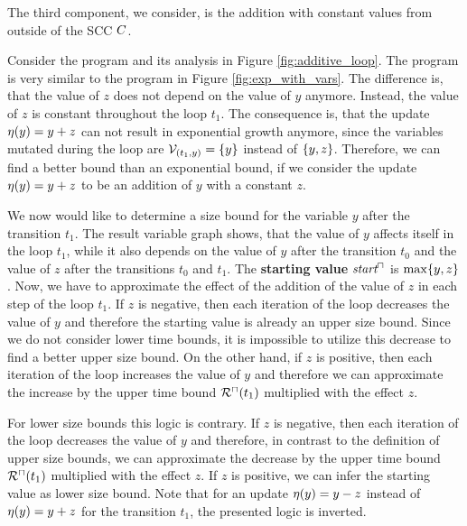 The third component, we consider, is the addition with constant values from outside of the SCC $C$.

\begin{example}
  
  Consider the program and its analysis in Figure \ref{fig:additive_loop}.
  The program is very similar to the program in Figure \ref{fig:exp_with_vars}.
  The difference is, that the value of $z$ does not depend on the value of $y$ anymore.
  Instead, the value of $z$ is constant throughout the loop $t_1$.
  The consequence is, that the update $\eta(y) = y + z$ can not result in exponential growth anymore, since the variables mutated during the loop are $\mathcal{V}_{(t_1,y)} = \lbrace y \rbrace$ instead of $\lbrace y,z \rbrace$.
  Therefore, we can find a better bound than an exponential bound, if we consider the update $\eta(y) = y + z$ to be an addition of $y$ with a constant $z$.
  
  We now would like to determine a size bound for the variable $y$ after the transition $t_1$.
  The result variable graph shows, that the value of $y$ affects itself in the loop $t_1$, while it also depends on the value of $y$ after the transition $t_0$ and the value of $z$ after the transitions $t_0$ and $t_1$.
  The \textbf{starting value} $\emph{start}^\sqcap$ is $\max \lbrace y,z \rbrace$.
  Now, we have to approximate the effect of the addition of the value of $z$ in each step of the loop $t_1$.
  If $z$ is negative, then each iteration of the loop decreases the value of $y$ and therefore the starting value is already an upper size bound.
  Since we do not consider lower time bounds, it is impossible to utilize this decrease to find a better upper size bound.
  On the other hand, if $z$ is positive, then each iteration of the loop increases the value of $y$ and therefore we can approximate the increase by the upper time bound ${\mathcal{R}^\sqcap}(t_1)$ multiplied with the effect $z$.
  
  For lower size bounds this logic is contrary.
  If $z$ is negative, then each iteration of the loop decreases the value of $y$ and therefore, in contrast to the definition of upper size bounds, we can approximate the decrease by the upper time bound ${\mathcal{R}^\sqcap}(t_1)$ multiplied with the effect $z$.
  If $z$ is positive, we can infer the starting value as lower size bound.
  Note that for an update $\eta(y) = y - z$ instead of $\eta(y) = y + z$ for the transition $t_1$, the presented logic is inverted.
  

\end{example}
